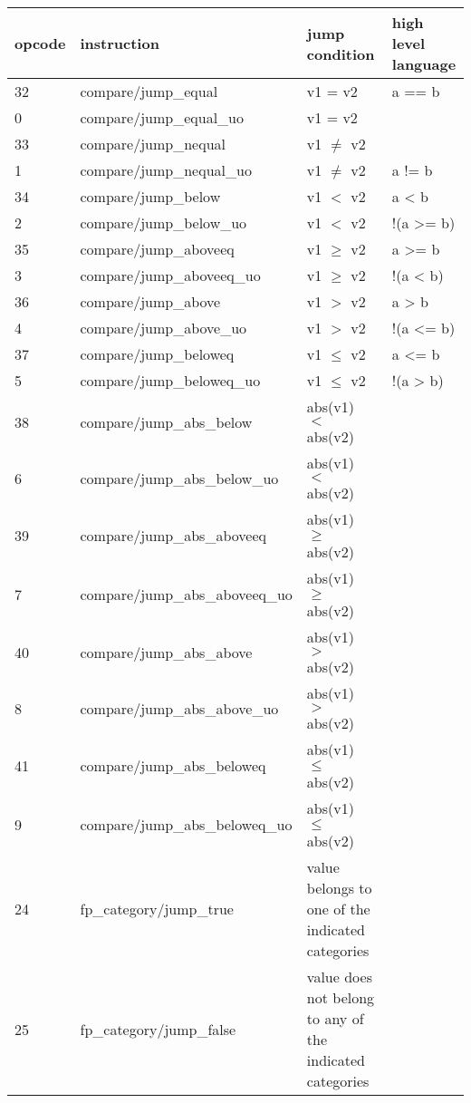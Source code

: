 \documentclass[forwardcom.tex]{subfiles}
\begin{document}
\label{table:floatCompareJumpInstructions}
\begin{tabular}{|p{12mm}|p{60mm}|p{40mm}|p{40mm}|}
\hline
\bfseries opcode & \bfseries instruction & \bfseries jump condition & \bfseries high level language \\ \hline
32 & compare/jump\_equal & v1 = v2 & a == b \\ \hline
0 & compare/jump\_equal\_uo & v1 = v2 &  \\ \hline
33 & compare/jump\_nequal  & v1 $\neq$ v2 &  \\ \hline
1 & compare/jump\_nequal\_uo  & v1 $\neq$ v2 & a != b \\ \hline
34 & compare/jump\_below & v1 $<$ v2 & a < b  \\ \hline
2 & compare/jump\_below\_uo & v1 $<$ v2 & !(a >= b)  \\ \hline
35 & compare/jump\_aboveeq & v1 $\geq$ v2 & a >= b  \\ \hline
3 & compare/jump\_aboveeq\_uo & v1 $\geq$ v2 & !(a < b)  \\ \hline
36 & compare/jump\_above & v1 $>$ v2 & a > b  \\ \hline
4 & compare/jump\_above\_uo & v1 $>$ v2 & !(a <= b)   \\ \hline
37 & compare/jump\_beloweq  & v1 $\leq$ v2 & a <= b  \\ \hline
5 & compare/jump\_beloweq\_uo  & v1 $\leq$ v2 & !(a > b)  \\ \hline

38 & compare/jump\_abs\_below & abs(v1) $<$ abs(v2) &   \\ \hline
6 & compare/jump\_abs\_below\_uo & abs(v1) $<$ abs(v2) &   \\ \hline
39 & compare/jump\_abs\_aboveeq & abs(v1) $\geq$ abs(v2) &   \\ \hline
7 & compare/jump\_abs\_aboveeq\_uo & abs(v1) $\geq$ abs(v2) &   \\ \hline
40 & compare/jump\_abs\_above & abs(v1) $>$ abs(v2) &    \\ \hline
8 & compare/jump\_abs\_above\_uo & abs(v1) $>$ abs(v2) &    \\ \hline
41 & compare/jump\_abs\_beloweq  & abs(v1) $\leq$ abs(v2) &   \\ \hline
9 & compare/jump\_abs\_beloweq\_uo  & abs(v1) $\leq$ abs(v2) &   \\ \hline
24 & fp\_category/jump\_true & value belongs to one of the indicated categories &   \\ \hline
25 &  fp\_category/jump\_false & value does not belong to any of the indicated categories &  \\ \hline
\hline
\end{tabular}
\vv
\end{document}
